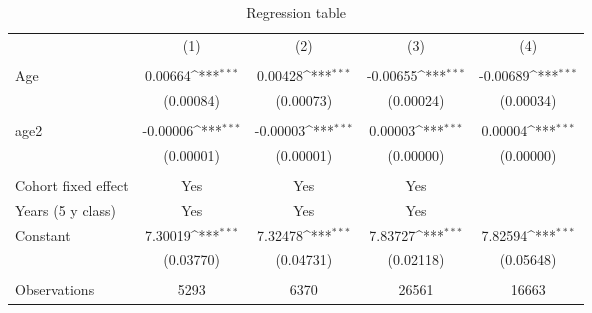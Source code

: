 \begin{table}[htbp]\centering
    \def\sym#1{\ifmmode^{#1}\else\(^{#1}\)\fi}
    \caption{Regression table \label{reg4}}
    \begin{tabular}{l*{4}{c}}
    \hline
                        &\multicolumn{1}{c}{(1)}         &\multicolumn{1}{c}{(2)}         &\multicolumn{1}{c}{(3)} 
                                &\multicolumn{1}{c}{(4)}         \\
                                \\
    \hline
    Age                 &     0.00664\sym{***}&     0.00428\sym{***}&    -0.00655\sym{***}&    -0.00689\sym{***}\\
                        &   (0.00084)         &   (0.00073)         &   (0.00024)         &   (0.00034)         \\
    \\
    age2                &    -0.00006\sym{***}&    -0.00003\sym{***}&     0.00003\sym{***}&     0.00004\sym{***}\\
                        &   (0.00001)         &   (0.00001)         &   (0.00000)         &   (0.00000)         \\
    \\
    Cohort fixed effect & Yes & Yes & Yes \\
    Years (5 y class)& Yes & Yes & Yes \\
    Constant            &     7.30019\sym{***}&     7.32478\sym{***}&     7.83727\sym{***}&     7.82594\sym{***}\\
                        &   (0.03770)         &   (0.04731)         &   (0.02118)         &   (0.05648)         \\
                        \\
    \hline
    Observations        &        5293         &        6370         &       26561         &       16663         \\
    \end{tabular}
    \end{table}
    